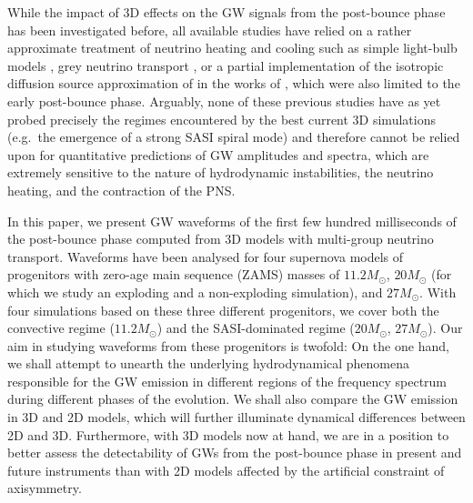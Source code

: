 While the impact of 3D effects on the GW signals from
the post-bounce phase has been investigated before, all available
studies have relied on a rather approximate treatment of neutrino
heating and cooling such as simple light-bulb models
\citep{mueller_97,kotake_09,kotake_11}, grey neutrino transport
\citep{fryer_04,mueller_e_12}, or a partial implementation of the
isotropic diffusion source approximation of \citet{liebendoerfer_09}
in the works of \citet{scheidegger_08,scheidegger_10}, which were also
limited to the early post-bounce phase.  Arguably, none of these
previous studies have as yet probed precisely the regimes encountered
by the best current 3D simulations (e.g.\ the emergence
of a strong SASI spiral mode) and therefore cannot be relied upon for quantitative
predictions of GW amplitudes and spectra, which
are extremely sensitive to the nature of hydrodynamic instabilities,
the neutrino heating, and the contraction of the PNS.

In this paper, we present GW waveforms of the
first few hundred milliseconds of the post-bounce phase computed from 3D
models with multi-group neutrino transport. Waveforms have been
analysed for four supernova models of progenitors with zero-age main
sequence (ZAMS) masses of $11.2 M_\odot$, $20 M_\odot$  (for which
we study an exploding and a non-exploding simulation), and $27
M_\odot$. With four simulations based on these three different
progenitors, we cover both the convective
regime ($11.2 M_\odot$) and the SASI-dominated regime ($20 M_\odot$,
$27 M_\odot$). Our aim in studying waveforms from these progenitors is
twofold: On the one hand, we shall attempt to unearth the underlying
hydrodynamical phenomena responsible for the GW emission in different 
regions of the frequency spectrum during different
phases of the evolution.  We shall also compare the GW
emission in 3D and 2D models, which will further illuminate dynamical
differences between 2D and 3D. Furthermore, with 3D models now
at hand, we are in a position to better assess the detectability of
GWs from the post-bounce phase in present and future
instruments than with 2D models affected by the artificial constraint
of axisymmetry.

